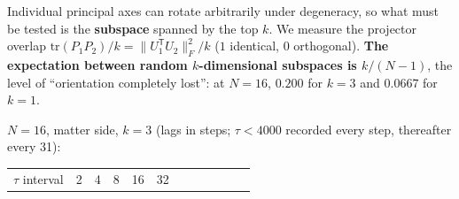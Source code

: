 \documentclass[
  10pt,
]{article}
\newcounter{none} %
\begin{document}
Individual principal axes can rotate arbitrarily under degeneracy, so
what must be tested is the \textbf{subspace} spanned by the top \(k\).
We measure the projector overlap
\(\mathrm{tr}(P_1P_2)/k = \lVert U_1^{\mathsf T}U_2\rVert_F^2/k\) (\(1\)
identical, \(0\) orthogonal). \textbf{The expectation between random
\(k\)-dimensional subspaces is \(k/(N-1)\)}, the level of ``orientation
completely lost'': at \(N=16\), \(0.200\) for \(k=3\) and \(0.0667\) for
\(k=1\).

\(N=16\), matter side, \(k=3\) (lags in steps; \(\tau<4000\) recorded
every step, thereafter every 31):

{\def\LTcaptype{none} %
\begin{longtable}[]{@{}
  >{\raggedright\arraybackslash}p{}
  >{\raggedright\arraybackslash}p{}
  >{\raggedright\arraybackslash}p{}
  >{\raggedright\arraybackslash}p{}
  >{\raggedright\arraybackslash}p{}
  >{\raggedright\arraybackslash}p{}
  >{\raggedright\arraybackslash}p{}
  >{\raggedright\arraybackslash}p{}
  >{\raggedright\arraybackslash}p{}
  >{\raggedright\arraybackslash}p{}
  >{\raggedright\arraybackslash}p{}
  >{\raggedright\arraybackslash}p{}@{}}
\toprule\noalign{}
\begin{minipage}[b]{\linewidth}\raggedright
\(\tau\) interval
\end{minipage} & \begin{minipage}[b]{\linewidth}\raggedright
2
\end{minipage} & \begin{minipage}[b]{\linewidth}\raggedright
4
\end{minipage} & \begin{minipage}[b]{\linewidth}\raggedright
8
\end{minipage} & \begin{minipage}[b]{\linewidth}\raggedright
16
\end{minipage} & \begin{minipage}[b]{\linewidth}\raggedright
32
\end{minipage} & \begin{minipage}[b]{\linewidth}\raggedright

\end{minipage}
\end{longtable}}
\end{document}
